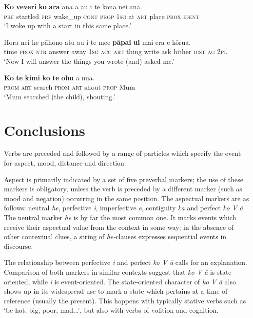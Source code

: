 \ea\label{ex:7.190}
\gll \textbf{Ko} \textbf{veveri} \textbf{ko} \textbf{{\ꞌ}ara} {\ꞌ}ana a au {\ꞌ}i te kona nei {\ꞌ}ana. \\
\textsc{prf} startled \textsc{prf} wake\_up \textsc{cont} \textsc{prop} \textsc{1sg} at \textsc{art} place \textsc{prox} \textsc{ident} \\

\glt 
‘I woke up with a start in this same place.’ \textstyleExampleref{[R539-1.764]}
\z

\ea\label{ex:7.191}
\gll Hora nei he pāhono atu au i te me{\ꞌ}e \textbf{pāpa{\ꞌ}i} \textbf{{\ꞌ}ui} mai era e kōrua.\\
time \textsc{prox} \textsc{ntr} answer away \textsc{1sg} \textsc{acc} \textsc{art} thing write ask hither \textsc{dist} \textsc{ag} \textsc{2pl}\\

\glt 
‘Now I will answer the things you wrote (and) asked me.’ \textstyleExampleref{[1 Cor. 7:1]}
\z

\ea\label{ex:7.192}
\gll \textbf{Ko} \textbf{te} \textbf{kimi} \textbf{ko} \textbf{te} \textbf{ohu} a nua. \\
\textsc{prom} \textsc{art} search \textsc{prom} \textsc{art} shout \textsc{prop} Mum \\

\glt 
‘Mum searched (the child), shouting.’ \textstyleExampleref{[R236.082]} 
\z
{}
\section{Conclusions}\label{sec:7.8}

Verbs are preceded and followed by a range of particles which specify the event for aspect, mood, distance and direction. 

Aspect is primarily indicated by a set of five preverbal markers; the use of these markers is obligatory, unless the verb is preceded by a different marker (such as mood and negation) occurring in the same position. The aspectual markers are as follows: neutral \textit{he}, perfective \textit{i}, imperfective \textit{e}, contiguity \textit{ka} and perfect \textit{ko V {\ꞌ}ā}. The neutral marker \textit{he} is by far the most common one. It marks events which receive their aspectual value from the context in some way; in the absence of other contextual clues, a string of \textit{he-}clauses expresses sequential events in discourse.

The relationship between perfective \textit{i} and perfect \textit{ko V {\ꞌ}ā} calls for an explanation. Comparison of both markers in similar contexts suggest that \textit{ko V {\ꞌ}ā} is state-oriented, while \textit{i} is event-oriented. The state-oriented character of \textit{ko V {\ꞌ}ā} also shows up in its widespread use to mark a state which pertains at a time of reference (usually the present). This happens with typically stative verbs such as ‘be hot, big, poor, mad...’, but also with verbs of volition and cognition.

